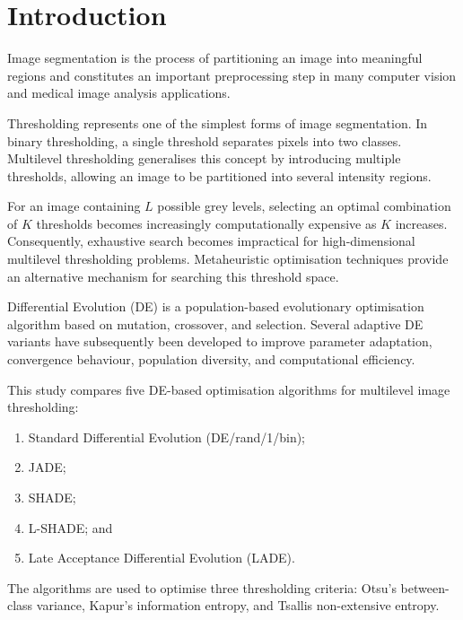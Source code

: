 \documentclass[review]{elsarticle}
\begin{document}

\section{Introduction}
\label{sec:introduction}

Image segmentation is the process of partitioning an image into
meaningful regions and constitutes an important preprocessing step in
many computer vision and medical image analysis applications.

Thresholding represents one of the simplest forms of image segmentation.
In binary thresholding, a single threshold separates pixels into two
classes. Multilevel thresholding generalises this concept by introducing
multiple thresholds, allowing an image to be partitioned into several
intensity regions.

For an image containing $L$ possible grey levels, selecting an optimal
combination of $K$ thresholds becomes increasingly computationally
expensive as $K$ increases. Consequently, exhaustive search becomes
impractical for high-dimensional multilevel thresholding problems.
Metaheuristic optimisation techniques provide an alternative mechanism
for searching this threshold space.

Differential Evolution (DE) is a population-based evolutionary
optimisation algorithm based on mutation, crossover, and selection.
Several adaptive DE variants have subsequently been developed to improve
parameter adaptation, convergence behaviour, population diversity, and
computational efficiency.

This study compares five DE-based optimisation algorithms for multilevel
image thresholding:

\begin{enumerate}
    \item Standard Differential Evolution (DE/rand/1/bin);
    \item JADE;
    \item SHADE;
    \item L-SHADE; and
    \item Late Acceptance Differential Evolution (LADE).
\end{enumerate}

The algorithms are used to optimise three thresholding criteria:
Otsu's between-class variance, Kapur's information entropy, and
Tsallis non-extensive entropy.
\end{document}
